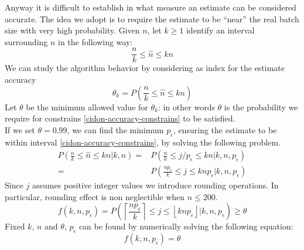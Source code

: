 \documentclass[11pt,a4paper,twoside,openright]{book}
\newcommand{\pc}{p_{\epsilon}}
\begin{document}
Anyway it is difficult to establish in what measure an estimate can be considered accurate. The idea we adopt is to require the estimate to be ``near'' the real batch size with very high probability. 
Given $n$, let $k \geq1$ identify an interval surrounding $n$ in the following way: 
\begin{equation}
\frac{n}{k}\leq\hat{n}\leq kn
\label{cidon-accuracy-constrains}
\end{equation}
We can study the algorithm behavior by considering as index for the estimate accuracy
\begin{equation}
\theta_{k}=P\left(\frac{n}{k}\leq\hat{n}\leq kn\right)
\end{equation}
Let $\theta$ be the minimum allowed value for $\theta_{k}$: in other words $\theta$ is the probability we require for constrains \eqref{cidon-accuracy-constrains} to be satisfied.\\
If we set $\theta=0.99$, we can find the minimum $\pc$, ensuring the estimate to be within interval \eqref{cidon-accuracy-constrains}, by solving the following problem.\\
\begin{equation}
\begin{split}
P\left(\frac{n}{k}\leq \hat{n} \leq kn \big| k,n\right)=& P\left(\frac{n}{k}\leq j/\pc \leq kn \big| k,n,\pc\right)\\
=&P\left(\frac{n\pc}{k}\leq j \leq kn\pc \big| k,n,\pc\right)
\end{split}
\label{cidon-accuracy-bounds}
\end{equation}
Since $j$ assumes positive integer values we introduce rounding operations. In particular, rounding effect is non neglectible when $n\leq 200$.  \\
\begin{equation}
f(k,n,\pc) = P\left(\left\lceil \frac{n\pc}{k}\right\rceil\leq j \leq \left\lfloor kn\pc\right\rfloor \big| k,n,\pc\right)\geq \theta
\end{equation}
Fixed $k$, $n$ and $\theta$, $\pc$ can be found by numerically solving the following equation:
\begin{equation}
f(k,n,\pc) = \theta
\end{equation}
\end{document}
